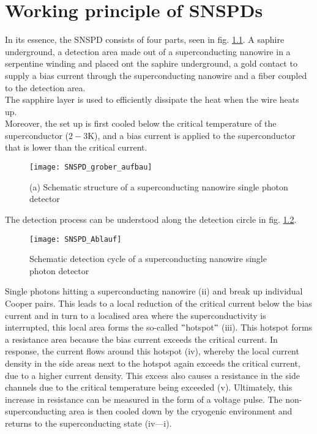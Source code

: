 \graphicspath{{/Users/maxim.re/Studium/Physik B.Sc./Semester_8_SS24/Proseminar/Figs Single Photon Detection/}}

\chapter{Working principle of SNSPDs}
\label{sec:SNSPD_working_principle}

In its essence, the SNSPD consists of four parts, seen in fig. \ref{fig:SNSPD_rough_structure}.
A saphire underground, a detection area made out of a superconducting nanowire in a serpentine winding and placed ont the
saphire underground, a gold contact to supply a bias current through the superconducting nanowire and a fiber coupled
to the detection area.\\
The sapphire layer is used to efficiently dissipate the heat when the wire heats up. \\
Moreover, the set up is first cooled below the critical temperature of the superconductor ($2-3 \text{K}$),
and a bias current is applied to the superconductor that is lower than the critical current.

\begin{figure}[hhh]
    \centering
    \texttt{[image: SNSPD\_grober\_aufbau]}
    \caption{(a) Schematic structure of a superconducting nanowire single photon detector \cite{steudle-2012}}
    \label{fig:SNSPD_rough_structure}
\end{figure}

The detection process can be understood along the detection circle in fig. \ref{fig: SNSPD_process}.

\begin{figure}[hhh]
    \centering
    \texttt{[image: SNSPD\_Ablauf]}
    \caption{Schematic detection cycle of a superconducting nanowire single photon detector \cite{singlequantum_snsd_nodate} }
    \label{fig: SNSPD_process}
\end{figure}

Single photons hitting a superconducting nanowire (ii) and break up individual Cooper pairs.
This leads to a local reduction of the critical current below the bias current and in turn to a localised area where
the superconductivity is interrupted, this local area forms the so-called \("\)hotspot\("\) (iii).
This hotspot forms a resistance area because the bias current exceeds the critical current.
In response, the current flows around this hotspot (iv), whereby the local current density in the side areas next to the
hotspot again exceeds the critical current, due to a higher current density.
This excess also causes a resistance in the side channels due to the critical temperature being exceeded (v).
Ultimately, this increase in resistance can be measured in the form of a voltage pulse.
The non-superconducting area is then cooled down by the cryogenic environment and returns to the superconducting state
(iv—i).\\

